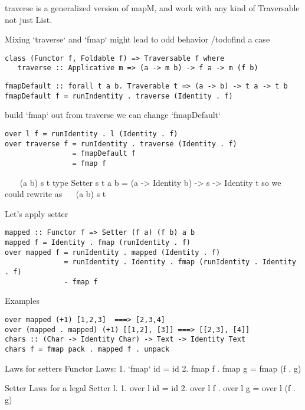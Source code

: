 traverse is a generalized version of mapM, and work with any kind of Traversable not just List.

Mixing `traverse` and `fmap` might lead to odd behavior /todo{find a case}

\begin{verbatim}
class (Functor f, Foldable f) => Traversable f where
   traverse :: Applicative m => (a -> m b) -> f a -> m (f b)
\end{verbatim}

\begin{verbatim}
fmapDefault :: forall t a b. Traverable t => (a -> b) -> t a -> t b
fmapDefault f = runIndentity . traverse (Identity . f)
\end{verbatim}

build `fmap` out from traverse
we can change `fmapDefault`

\begin{verbatim}
over l f = runIdentity . l (Identity . f)
over traverse f = runIdentity . traverse (Identity . f)
                = fmapDefault f
                = fmap f
\end{verbatim}


~\hs{::}~~\hs{->} (a \hs{->} b) \hs{->} s \hs{->} t
type Setter s t a b = (a -> Identity b) -> s -> Identity t
so we could rewrite  as
~\hs{::}~ \hs{->} (a \hs{->} b) \hs{->} s \hs{->} t

Let’s apply setter

\begin{verbatim}
mapped :: Functor f => Setter (f a) (f b) a b
mapped f = Identity . fmap (runIdentity . f)
over mapped f = runIdentity . mapped (Identity . f)
              = runIdentity . Identity . fmap (runIdentity . Identity . f)
              - fmap f
\end{verbatim}

Examples

\begin{verbatim}
over mapped (+1) [1,2,3]  ===> [2,3,4]
over (mapped . mapped) (+1) [[1,2], [3]] ===> [[2,3], [4]]
chars :: (Char -> Identity Char) -> Text -> Identity Text
chars f = fmap pack . mapped f . unpack
\end{verbatim}

Laws for setters
Functor Laws:
1. `fmap` id = id
2. fmap f . fmap g = fmap (f . g)

Setter Laws for a legal Setter l.
1. over l id = id
2. over l f . over l g = over l (f . g)


